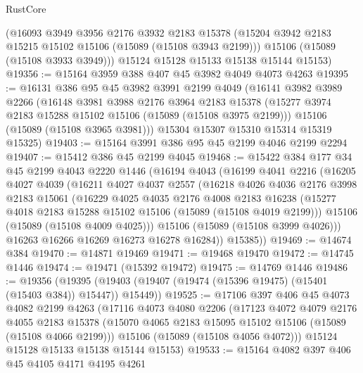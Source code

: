 \begin{lexlean}{RustCore}
\begin{coremodule}
      (@16093
        @3949
        @3956
        @2176
        @3932
        @2183
        @15378
        (@15204 @3942 @2183 @15215 @15102 @15106 (@15089 (@15108 @3943 @2199)))
        @15106
        (@15089 (@15108 @3933 @3949)))
      @15124
      @15128
      @15133
      @15138
      @15144
      @15153)
@19356 := @15164 @3959 @388 @407 @45 @3982 @4049 @4073 @4263
@19395 := @16131
    @386
    @95
    @45
    @3982
    @3991
    @2199
    @4049
    (@16141
      @3982
      @3989
      @2266
      (@16148
        @3981
        @3988
        @2176
        @3964
        @2183
        @15378
        (@15277 @3974 @2183 @15288 @15102 @15106 (@15089 (@15108 @3975 @2199)))
        @15106
        (@15089 (@15108 @3965 @3981)))
      @15304
      @15307
      @15310
      @15314
      @15319
      @15325)
@19403 := @15164 @3991 @386 @95 @45 @2199 @4046 @2199 @2294
@19407 := @15412 @386 @45 @2199 @4045
@19468 := @15422
    @384
    @177
    @34
    @45
    @2199
    @4043
    @2220
    @1446
    (@16194
      @4043
      (@16199
        @4041
        @2216
        (@16205
          @4027
          @4039
          (@16211
            @4027
            @4037
            @2557
            (@16218
              @4026
              @4036
              @2176
              @3998
              @2183
              @15061
              (@16229
                @4025
                @4035
                @2176
                @4008
                @2183
                @16238
                (@15277 @4018 @2183 @15288 @15102 @15106 (@15089 (@15108 @4019 @2199)))
                @15106
                (@15089 (@15108 @4009 @4025)))
              @15106
              (@15089 (@15108 @3999 @4026)))
            @16263
            @16266
            @16269
            @16273
            @16278
            @16284))
        @15385))
@19469 := @14674 @384
@19470 := @14871 @19469
@19471 := @19468 @19470
@19472 := @14745 @1446
@19474 := @19471 (@15392 @19472)
@19475 := @14769 @1446
@19486 := @19356
    (@19395 (@19403 (@19407 (@19474 (@15396 @19475) (@15401 (@15403 @384)) @15447)) @15449))
@19525 := @17106
    @397
    @406
    @45
    @4073
    @4082
    @2199
    @4263
    (@17116
      @4073
      @4080
      @2206
      (@17123
        @4072
        @4079
        @2176
        @4055
        @2183
        @15378
        (@15070 @4065 @2183 @15095 @15102 @15106 (@15089 (@15108 @4066 @2199)))
        @15106
        (@15089 (@15108 @4056 @4072)))
      @15124
      @15128
      @15133
      @15138
      @15144
      @15153)
@19533 := @15164 @4082 @397 @406 @45 @4105 @4171 @4195 @4261

\end{coremodule}
\end{lexlean}
